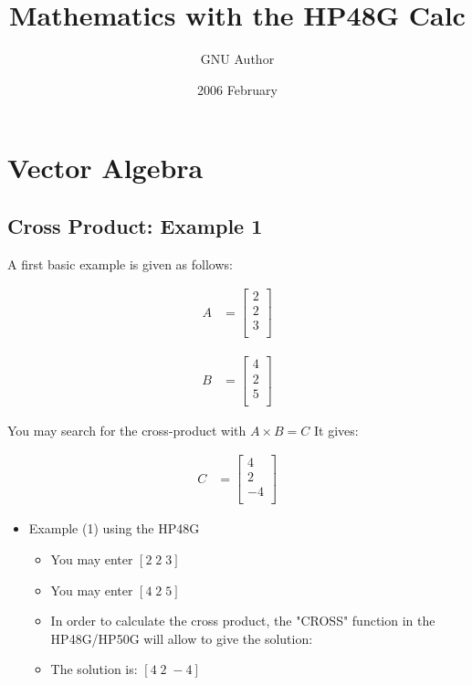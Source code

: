 \documentclass[11pt]{article}
\begin{document}
\title{Mathematics with the HP48G Calc}
\author{GNU Author}
\date{2006 February}
\maketitle

\section{Vector Algebra}
\subsection{Cross Product: Example 1}

A first basic example is given as follows:

\begin{align}
A &= \begin{bmatrix}
   2 \\
   2 \\
   3 \\
\end{bmatrix}
\end{align}

\begin{align}
B &= \begin{bmatrix}
   4 \\
   2 \\
   5 \\
\end{bmatrix}
\end{align}

You may search for the cross-product with  $ A \times B = C $
It gives:

\begin{align}
C &= \begin{bmatrix}
   4 \\
   2 \\
   -4 \\
\end{bmatrix}
\end{align}


\begin{itemize}
\item Example (1) using the HP48G
\begin{itemize}
\item You may enter  $ [ 2 \; 2 \; 3 ] $
\item You may enter  $ [ 4 \; 2  \; 5 ] $
\item In order to calculate the cross product, the "CROSS" function in the HP48G/HP50G will allow to give the solution:
\item The solution is:  $ [ 4 \;  2 \; -4 ] $
\end{itemize}
\end{itemize}
\end{document}
